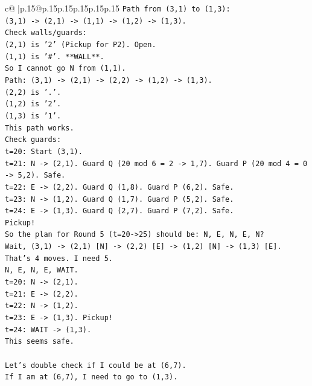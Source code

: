 \documentclass{article}
\begin{document}
{\begin{supertabular}{c@{$\;$}|p{.15\linewidth}@{}p{.15\linewidth}p{.15\linewidth}p{.15\linewidth}p{.15\linewidth}p{.15\linewidth}}
{{{\texttt{Path from (3,1) to (1,3):} \\
\texttt{(3,1) {-}> (2,1) {-}> (1,1) {-}> (1,2) {-}> (1,3).} \\
\texttt{Check walls/guards:} \\
\texttt{(2,1) is '2' (Pickup for P2). Open.} \\
\texttt{(1,1) is '\#'. **WALL**.} \\
\texttt{So I cannot go N from (1,1).} \\
\texttt{Path: (3,1) {-}> (2,1) {-}> (2,2) {-}> (1,2) {-}> (1,3).} \\
\texttt{(2,2) is '.'.} \\
\texttt{(1,2) is '2'.} \\
\texttt{(1,3) is '1'.} \\
\texttt{This path works.} \\
\texttt{Check guards:} \\
\texttt{t=20: Start (3,1).} \\
\texttt{t=21: N {-}> (2,1). Guard Q (20 mod 6 = 2 {-}> 1,7). Guard P (20 mod 4 = 0 {-}> 5,2). Safe.} \\
\texttt{t=22: E {-}> (2,2). Guard Q (1,8). Guard P (6,2). Safe.} \\
\texttt{t=23: N {-}> (1,2). Guard Q (1,7). Guard P (5,2). Safe.} \\
\texttt{t=24: E {-}> (1,3). Guard Q (2,7). Guard P (7,2). Safe.} \\
\texttt{Pickup!} \\
\texttt{So the plan for Round 5 (t=20{-}>25) should be: N, E, N, E, N?} \\
\texttt{Wait, (3,1) {-}> (2,1) {[}N{]} {-}> (2,2) {[}E{]} {-}> (1,2) {[}N{]} {-}> (1,3) {[}E{]}.} \\
\texttt{That's 4 moves. I need 5.} \\
\texttt{N, E, N, E, WAIT.} \\
\texttt{t=20: N {-}> (2,1).} \\
\texttt{t=21: E {-}> (2,2).} \\
\texttt{t=22: N {-}> (1,2).} \\
\texttt{t=23: E {-}> (1,3). Pickup!} \\
\texttt{t=24: WAIT {-}> (1,3).} \\
\texttt{This seems safe.} \\
\\ 
\texttt{Let's double check if I could be at (6,7).} \\
\texttt{If I am at (6,7), I need to go to (1,3).} \\
}}}
\end{supertabular}}
\end{document}
